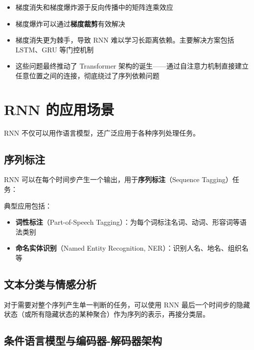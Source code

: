 \documentclass[a4paper]{article}
\begin{document}
\begin{itemize}
    \item 梯度消失和梯度爆炸源于反向传播中的矩阵连乘效应
    \item 梯度爆炸可以通过\textbf{梯度裁剪}有效解决
    \item 梯度消失更为棘手，导致 RNN 难以学习长距离依赖。主要解决方案包括 LSTM、GRU 等门控机制
    \item 这些问题最终推动了 Transformer 架构的诞生——通过自注意力机制直接建立任意位置之间的连接，彻底绕过了序列依赖问题
\end{itemize}


\section{RNN 的应用场景}

RNN 不仅可以用作语言模型，还广泛应用于各种序列处理任务。

\subsection{序列标注}

RNN 可以在每个时间步产生一个输出，用于\textbf{序列标注}（Sequence Tagging）任务：





典型应用包括：
\begin{itemize}
    \item \textbf{词性标注}（Part-of-Speech Tagging）：为每个词标注名词、动词、形容词等语法类别
    \item \textbf{命名实体识别}（Named Entity Recognition, NER）：识别人名、地名、组织名等
\end{itemize}

\subsection{文本分类与情感分析}

对于需要对整个序列产生单一判断的任务，可以使用 RNN 最后一个时间步的隐藏状态（或所有隐藏状态的某种聚合）作为序列的表示，再接分类层。





\subsection{条件语言模型与编码器-解码器架构}
\end{document}
